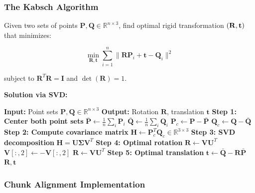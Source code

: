 \documentclass[11pt,a4paper]{article}
\begin{document}
\subsubsection{The Kabsch Algorithm}

Given two sets of points $\mathbf{P}, \mathbf{Q} \in \mathbb{R}^{n \times 3}$, find optimal rigid transformation $({\bf R}, {\bf t})$ that minimizes:

\begin{equation}
\min_{\mathbf{R}, \mathbf{t}} \sum_{i=1}^{n} \|\mathbf{R} \mathbf{P}_i + \mathbf{t} - \mathbf{Q}_i\|^2
\end{equation}

subject to $\mathbf{R}^T \mathbf{R} = \mathbf{I}$ and $\det(\mathbf{R}) = 1$.

\textbf{Solution via SVD:}

\begin{algorithm}
\caption{Kabsch Algorithm}
\begin{algorithmic}[1]
\State \textbf{Input:} Point sets $\mathbf{P}, \mathbf{Q} \in \mathbb{R}^{n \times 3}$
\State \textbf{Output:} Rotation $\mathbf{R}$, translation $\mathbf{t}$
\State
\State \textbf{Step 1: Center both point sets}
\State $\bar{\mathbf{P}} \gets \frac{1}{n} \sum_{i} \mathbf{P}_i$
\State $\bar{\mathbf{Q}} \gets \frac{1}{n} \sum_{i} \mathbf{Q}_i$
\State $\mathbf{P}_c \gets \mathbf{P} - \bar{\mathbf{P}}$
\State $\mathbf{Q}_c \gets \mathbf{Q} - \bar{\mathbf{Q}}$
\State
\State \textbf{Step 2: Compute covariance matrix}
\State $\mathbf{H} \gets \mathbf{P}_c^T \mathbf{Q}_c \in \mathbb{R}^{3 \times 3}$
\State
\State \textbf{Step 3: SVD decomposition}
\State $\mathbf{H} = \mathbf{U} \mathbf{\Sigma} \mathbf{V}^T$
\State
\State \textbf{Step 4: Optimal rotation}
\State $\mathbf{R} \gets \mathbf{V} \mathbf{U}^T$
 
    \State $\mathbf{V}[:, 2] \gets -\mathbf{V}[:, 2]$ 
    \State $\mathbf{R} \gets \mathbf{V} \mathbf{U}^T$
\EndIf
\State
\State \textbf{Step 5: Optimal translation}
\State $\mathbf{t} \gets \bar{\mathbf{Q}} - \mathbf{R} \bar{\mathbf{P}}$
\State
\State \Return $\mathbf{R}, \mathbf{t}$
\end{algorithmic}
\end{algorithm}

\subsubsection{Chunk Alignment Implementation}
\end{document}
